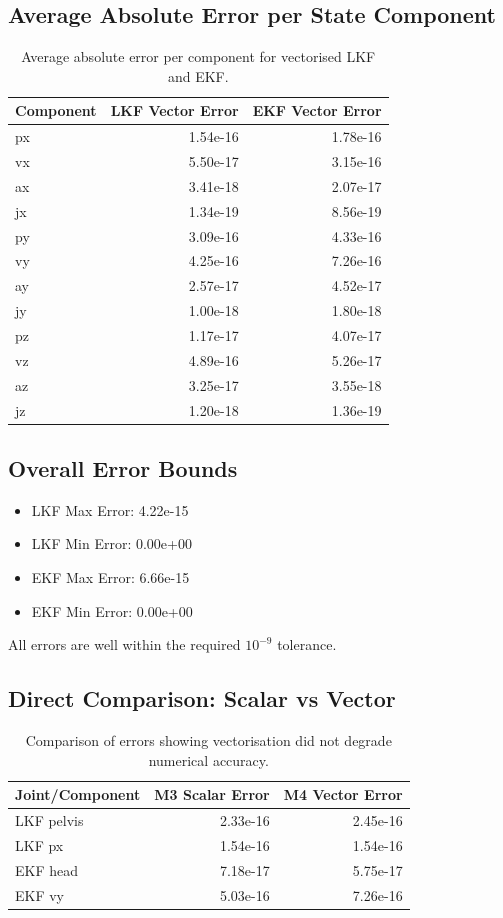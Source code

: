 \documentclass{article}
\begin{document}
\subsection{Average Absolute Error per State Component}
\begin{table}[ht]
\centering
\begin{tabular}{|l|r|r|}
\hline
Component & LKF Vector Error & EKF Vector Error \\
\hline
px & 1.54e-16 & 1.78e-16 \\
vx & 5.50e-17 & 3.15e-16 \\
ax & 3.41e-18 & 2.07e-17 \\
jx & 1.34e-19 & 8.56e-19 \\
py & 3.09e-16 & 4.33e-16 \\
vy & 4.25e-16 & 7.26e-16 \\
ay & 2.57e-17 & 4.52e-17 \\
jy & 1.00e-18 & 1.80e-18 \\
pz & 1.17e-17 & 4.07e-17 \\
vz & 4.89e-16 & 5.26e-17 \\
az & 3.25e-17 & 3.55e-18 \\
jz & 1.20e-18 & 1.36e-19 \\
\hline
\end{tabular}
\caption{Average absolute error per component for vectorised LKF and EKF.}
\end{table}

\subsection{Overall Error Bounds}
\begin{itemize}
\item LKF Max Error: 4.22e-15
\item LKF Min Error: 0.00e+00
\item EKF Max Error: 6.66e-15
\item EKF Min Error: 0.00e+00
\end{itemize}
All errors are well within the required $10^{-9}$ tolerance.

\subsection{Direct Comparison: Scalar vs Vector}
\begin{table}[ht]
\centering
\begin{tabular}{|l|r|r|}
\hline
Joint/Component & M3 Scalar Error & M4 Vector Error \\
\hline
LKF pelvis & 2.33e-16 & 2.45e-16 \\
LKF px & 1.54e-16 & 1.54e-16 \\
EKF head & 7.18e-17 & 5.75e-17 \\
EKF vy & 5.03e-16 & 7.26e-16 \\
\hline
\end{tabular}
\caption{Comparison of errors showing vectorisation did not degrade numerical accuracy.}
\end{table}
\end{document}
